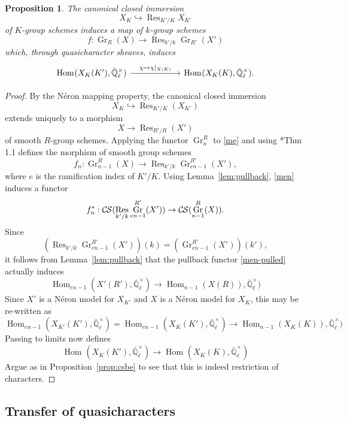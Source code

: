 \documentclass[10pt]{amsart}
\theoremstyle{plain}
\newtheorem{proposition}[theorem]{Proposition}
\theoremstyle{definition}
\newcommand{\EE}{\mathbb{\bar Q}_\ell}
\newcommand{\Fq}{k}
\newcommand{\EEx}{\EE^\times}
\DeclareMathOperator{\Hom}{Hom}
\DeclareMathOperator{\Gr}{Gr}
\DeclareMathOperator{\Res}{Res}
\newcommand{\CS}{{\mathcal{C\hskip-0.8pt S}}}
\begin{document}
\begin{proposition}\label{prop:wrK}
The canonical closed immersion 
\[
X_K \hookrightarrow \Res_{K'/K} X_{K'}
\]
of $K$-group schemes
induces a map of $\Fq$-group schemes 
\[
f : \Gr_R(X) \to \Res_{k'/k} \Gr_{R'}(X')
\] 
which, through quasicharacter sheaves, induces
\[
\begin{tikzcd}[column sep=60]
\Hom_{\text{}}(X_K(K'), \EEx) \arrow{r}{\chi \mapsto \chi\vert_{X(K)}} &\Hom_{\text{}}(X_K(K), \EEx).
\end{tikzcd}
\]
\end{proposition}

\begin{proof}
By the N\'eron mapping property, the canonical closed immersion
\[
X_K\hookrightarrow \Res_{K'/K}(X_{K'})
\]
 extends uniquely to a morphism
\begin{equation}\label{me}
X\to \Res_{R'/R}(X')
\end{equation}
 of smooth $R$-group schemes.
%
Applying the functor $\Gr^R_{n}$ to \eqref{me}
and using \cite{bertrapelle-gonzales:Greenberg}*{Thm 1.1} defines the morphism of smooth group schemes
\begin{equation}\label{men}
f_n: \Gr_{n-1}^R(X) \to \Res_{k'/k} \Gr_{en-1}^{R'}(X'),
\end{equation}
where $e$ is the ramification index of $K'/K$.
Using Lemma~\ref{lem:pullback}, \eqref{men} induces a functor 
\begin{equation}\label{men-pulled}
f_n^* : \CS(\Res_{k'/k} \Gr_{en-1}^{R'}(X'))\to \CS(\Gr_{n-1}^{R}(X)).
\end{equation}
Since 
\[
\left(\Res_{k'/k} \Gr_{en-1}^{R'}(X') \right)(\Fq) = \left(\Gr_{en-1}^{R'}(X')\right)(k'),
\]
it follows from Lemma~\ref{lem:pullback} that the pullback functor \eqref{men-pulled} actually induces
\[ 
\Hom_{en-1}(X'(R'),\EEx) \to \Hom_{n-1}(X(R)),\EEx)
\]
Since $X'$ is a N\'eron model for $X_{K'}$ and $X$ is a N\'eron model for $X_K$,
 this may be re-written as
 \[ 
\Hom_{en-1}(X_{K'}(K'),\EEx)= \Hom_{en-1}(X_{K}(K'),\EEx) \to \Hom_{n-1}(X_K(K)),\EEx)
\]
Passing to limits now defines
\[ 
\Hom_\text{}(X_K(K'),\EEx) \to \Hom_\text{}(X_K(K),\EEx)
\]
Argue as in Proposition~\ref{prop:csbe} to see that this is indeed restriction of characters.
\end{proof}

\subsection{Transfer of quasicharacters}\label{ssec:transfer}
\end{document}
